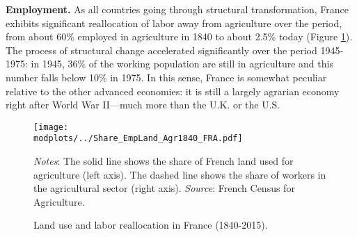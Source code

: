 \documentclass[./20250130-paper.tex]{subfiles}
\begin{document}
\textbf{Employment.} As all countries going through structural transformation, France exhibits significant reallocation of labor away from agriculture over the period, from about 60\% employed in agriculture in 1840 to about 2.5\% today (Figure \ref{fig:share_landlabor}). The process of structural change accelerated significantly over the period 1945-1975: in 1945, 36\% of the working population are still in agriculture and this number falls below 10\% in 1975. In this sense, France is somewhat peculiar relative to the other advanced economies: it is still a largely agrarian economy right after World War II---much more than the U.K. or the U.S.

\begin{figure}[h!]	
	\begin{center}
		\texttt{[image: \\modplots/../Share\_EmpLand\_Agr1840\_FRA.pdf]}
	\end{center}
	\vspace{-0.5cm}
	\caption{Land use and labor reallocation in France (1840-2015).\label{fig:share_landlabor}
	}
	{\footnotesize \textit{Notes}: The solid line shows the share of French land used for agriculture (left axis). The dashed line shows the share of workers in the agricultural sector (right axis).
		\textit{Source}: French Census for Agriculture.}
\end{figure}


\end{document}

